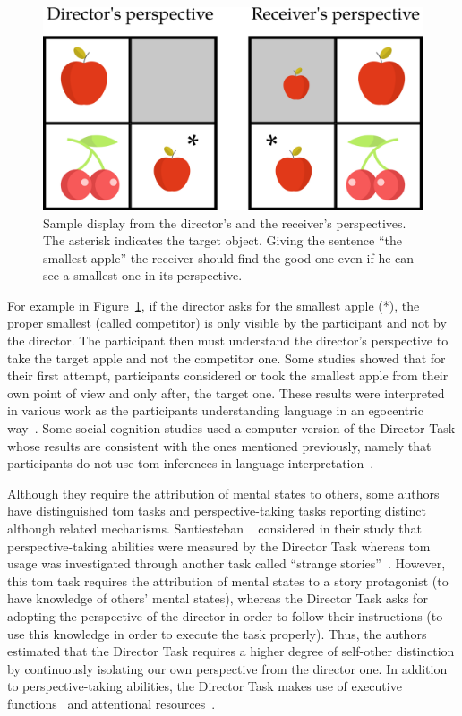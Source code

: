 \documentclass[a4paper,11pt,twoside]{StyleThese}
\begin{document}
\begin{figure}[ht!]
	\centering
	\includegraphics[scale=0.25]{figures/chapter4/dt_apple.png}
	\caption{\label{chap9:fig:dt_apple} Sample display from the director's and the receiver's perspectives. The asterisk indicates the target object. Giving the sentence ``the smallest apple'' the receiver should find the good one even if he can see a smallest one in its perspective. }
\end{figure}

For example in Figure~\ref{chap9:fig:dt_apple}, if the director asks for the smallest apple (*), the proper smallest (called competitor) is only visible by the participant and not by the director. The participant then must understand the director's perspective to take the target apple and not the competitor one. Some studies showed that for their first attempt, participants considered or took the smallest apple from their own point of view and only after, the target one. These results were interpreted in various work as the participants understanding language in an egocentric way~\cite{keysar_1994_illusory, keysar_1998_egocentric, keysar_2002_self, keysar_2003_limits}. 
Some social cognition studies used a computer-version of the Director Task whose results are consistent with the ones mentioned previously, namely that participants do not use \acrshort{tom} inferences in language interpretation~\cite{dumontheil_2010_online}.

Although they require the attribution of mental states to others, some authors have distinguished \acrshort{tom} tasks and perspective-taking tasks reporting distinct although related mechanisms. Santiesteban \etal{}~\cite{santiesteban_2012_training} considered in their study that perspective-taking abilities were measured by the Director Task whereas \acrshort{tom} usage was investigated through another task called ``strange stories''~\cite{happe_1994_advanced}. However, this \acrshort{tom} task requires the attribution of mental states to a story protagonist (to have knowledge of others' mental states), whereas the Director Task asks for adopting the perspective of the director in order to follow their instructions (to use this knowledge in order to execute the task properly). Thus, the authors estimated that the Director Task requires a higher degree of self-other distinction by continuously isolating our own perspective from the director one. In addition to perspective-taking abilities, the Director Task makes use of executive functions~\cite{rubio_2017_director} and attentional resources~\cite{lin_2010_reflexively}.
\end{document}
